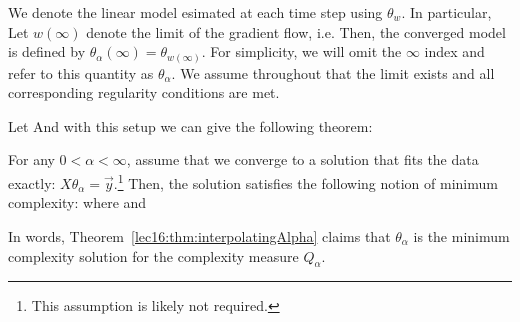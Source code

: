 We denote the linear model esimated at each time step using $\theta_w$. In particular,
Let $w(\infty)$ denote the limit of the gradient flow, i.e.
Then, the converged model is defined by $\theta_\alpha(\infty) = \theta_{w(\infty)}$.  For simplicity, we will omit the $\infty$ index and refer to this quantity as $\theta_\alpha$. We assume throughout that the limit exists and all corresponding regularity conditions are met.

Let
And with this setup we can give the following theorem:
\begin{theorem} \label{lec16:thm:interpolatingAlpha}
For any $0 < \alpha < \infty$, assume that we converge to a solution that fits the data exactly: $X \theta_{\alpha} = \vec{y}$.\footnote{This assumption is likely not required.}  Then, the solution satisfies the following notion of minimum complexity:
where
and
\end{theorem}
In words, Theorem~\ref{lec16:thm:interpolatingAlpha} claims that $\theta_\alpha$ is the minimum complexity solution for the complexity measure $Q_\alpha$.

